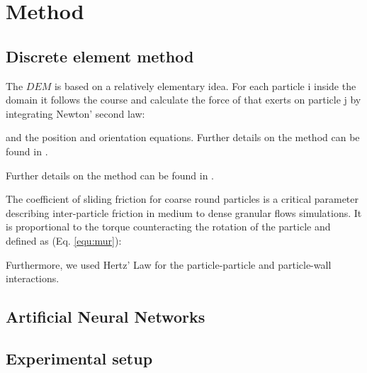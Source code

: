 
\section{Method}
\label{sec:method}


\subsection{Discrete element method}
\label{subsec:dem}
The $DEM$ is based on a relatively elementary idea. For each particle i inside
the domain it follows the course and calculate the force of that exerts on particle j
by integrating Newton' second law:

and the position and orientation equations.
Further details on the method can be found in \citet{RefWorks:133}.


Further details on the method can be found in \citet{RefWorks:133}.

The coefficient of sliding friction for coarse round particles is a critical
parameter describing inter-particle friction in medium to dense granular flows simulations.
It is proportional to the torque counteracting the rotation of the particle and defined as (Eq. \ref{equ:mur}):


Furthermore, we used Hertz' Law for the particle-particle and particle-wall interactions.



\subsection{Artificial Neural Networks}
\label{subsec:ann}
\lipsum[1]


\subsection{Experimental setup}
\label{subsec:experimentalsetup}
\lipsum[1]

